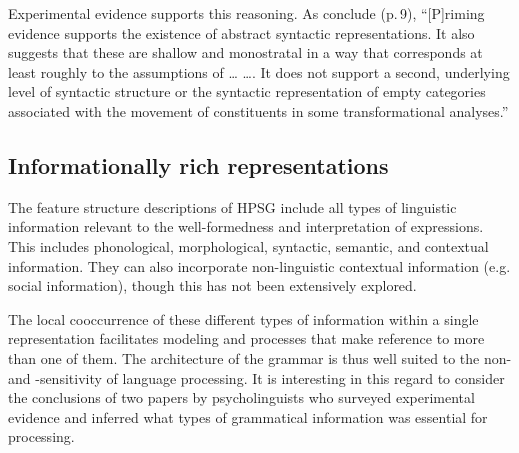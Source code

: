 \documentclass[a4paper]{article}
\begin{document}
Experimental evidence supports this reasoning.  As \citet{BraniganPickering2017} conclude (p.\,9), ``[P]riming evidence supports the existence of abstract syntactic representations. It also suggests
that these are shallow and monostratal in a way that corresponds at least roughly to the assumptions of \ldots{} \citet{ps2} \ldots{}. It does not support a second, underlying level of syntactic
structure or the syntactic representation of empty categories associated with the movement of constituents in some transformational analyses.''

\subsection{Informationally rich representations}

The feature structure descriptions of HPSG include all types of linguistic information relevant to the well-formedness and interpretation of expressions. This includes phonological, morphological, syntactic, semantic, and contextual information.  They can also incorporate non-linguistic contextual information (e.g. social information), though this has not been extensively explored.

The local cooccurrence of these different types of information within a single representation facilitates modeling  and  processes that make reference to more than one of them.  The architecture of the grammar is thus well suited to the non- and -sensitivity of language processing.  It is interesting in this regard to consider the conclusions of two papers by psycholinguists who surveyed experimental evidence and inferred what types of grammatical information was essential for processing.  
\end{document}
